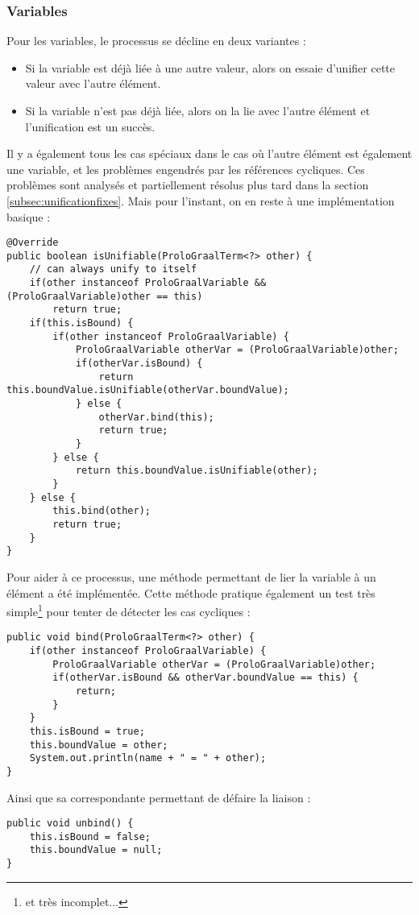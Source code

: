 \documentclass[../report.tex]{subfiles}
\begin{document}
\subsubsection{Variables}
Pour les variables, le processus se décline en deux variantes :
\begin{itemize}
    \item Si la variable est déjà liée à une autre valeur, alors on essaie d'unifier cette valeur avec l'autre élément.
    \item Si la variable n'est pas déjà liée, alors on la lie avec l'autre élément et l'unification est un succès.
\end{itemize}
Il y a également tous les cas spéciaux dans le cas où l'autre élément est également une variable, et les problèmes engendrés par les références cycliques. Ces problèmes sont analysés et partiellement résolus plus tard dans la section \ref{subsec:unificationfixes}. Mais pour l'instant, on en reste à une implémentation basique :
\begin{verbatim}
@Override
public boolean isUnifiable(ProloGraalTerm<?> other) {
    // can always unify to itself
    if(other instanceof ProloGraalVariable && (ProloGraalVariable)other == this)
        return true;
    if(this.isBound) {
        if(other instanceof ProloGraalVariable) {
            ProloGraalVariable otherVar = (ProloGraalVariable)other;
            if(otherVar.isBound) {
                return this.boundValue.isUnifiable(otherVar.boundValue);
            } else {
                otherVar.bind(this);
                return true;
            }
        } else {
            return this.boundValue.isUnifiable(other);
        }
    } else {
        this.bind(other);
        return true;
    }
}
\end{verbatim}
Pour aider à ce processus, une méthode permettant de lier la variable à un élément a été implémentée. Cette méthode pratique également un test très simple\footnote{et très incomplet...} pour tenter de détecter les cas cycliques :
\begin{verbatim}
public void bind(ProloGraalTerm<?> other) {
    if(other instanceof ProloGraalVariable) {
        ProloGraalVariable otherVar = (ProloGraalVariable)other;
        if(otherVar.isBound && otherVar.boundValue == this) {
            return;
        }
    }
    this.isBound = true;
    this.boundValue = other;
    System.out.println(name + " = " + other);
}
\end{verbatim}
Ainsi que sa correspondante permettant de défaire la liaison :
\begin{verbatim}
public void unbind() {
    this.isBound = false;
    this.boundValue = null;
}
\end{verbatim}
\end{document}
